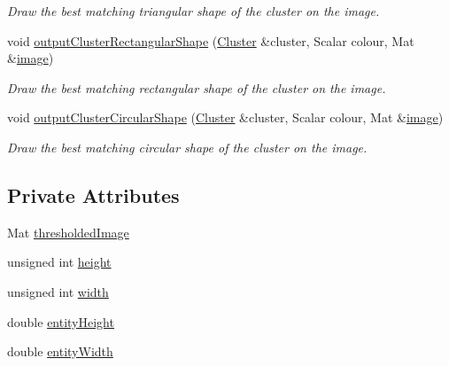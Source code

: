 \begin{DoxyCompactItemize}
\begin{DoxyCompactList}\small\item\em Draw the best matching triangular shape of the cluster on the image. \end{DoxyCompactList}\item 
void \hyperlink{classmultiscale_1_1analysis_1_1SimulationClusterDetector_ab7bfa2a55991a5708abfea7fa362214c}{output\-Cluster\-Rectangular\-Shape} (\hyperlink{classmultiscale_1_1analysis_1_1Cluster}{Cluster} \&cluster, Scalar colour, Mat \&\hyperlink{classmultiscale_1_1analysis_1_1Detector_a523830a6cfe409694ce8327c3c736fbd}{image})
\begin{DoxyCompactList}\small\item\em Draw the best matching rectangular shape of the cluster on the image. \end{DoxyCompactList}\item 
void \hyperlink{classmultiscale_1_1analysis_1_1SimulationClusterDetector_ab4e0ae4d5850be64ec2399d5c2c36828}{output\-Cluster\-Circular\-Shape} (\hyperlink{classmultiscale_1_1analysis_1_1Cluster}{Cluster} \&cluster, Scalar colour, Mat \&\hyperlink{classmultiscale_1_1analysis_1_1Detector_a523830a6cfe409694ce8327c3c736fbd}{image})
\begin{DoxyCompactList}\small\item\em Draw the best matching circular shape of the cluster on the image. \end{DoxyCompactList}\end{DoxyCompactItemize}
\subsection*{Private Attributes}
\begin{DoxyCompactItemize}
\item 
Mat \hyperlink{classmultiscale_1_1analysis_1_1SimulationClusterDetector_aca2aae9914ef643a543a834e61b1cccf}{thresholded\-Image}
\item 
unsigned int \hyperlink{classmultiscale_1_1analysis_1_1SimulationClusterDetector_a9d0a0fe5d9ea0f2516d07bf44b1da257}{height}
\item 
unsigned int \hyperlink{classmultiscale_1_1analysis_1_1SimulationClusterDetector_a4c66a82aa1749dce31c767bc4008d904}{width}
\item 
double \hyperlink{classmultiscale_1_1analysis_1_1SimulationClusterDetector_a2ba5c2738d32f71ccaacba4129b7bcfc}{entity\-Height}
\item 
double \hyperlink{classmultiscale_1_1analysis_1_1SimulationClusterDetector_a9212da88b787b8f9791f27d913b6d05d}{entity\-Width}
\end{DoxyCompactItemize}
